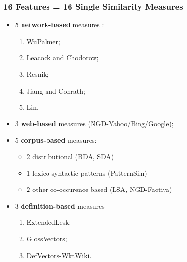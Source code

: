 \begin{frame}
\frametitle{16 Features = 16 Single Similarity Measures}

	\begin{itemize}
	
	\item 5 \textbf{network-based} measures :
	\begin{enumerate}
	  \item WuPalmer;
	  \item Leacock and Chodorow;
	  \item Resnik;
	  \item Jiang and Conrath;
	  \item Lin.
	\end{enumerate} 
	\item 3 \textbf{web-based} measures (NGD-Yahoo/Bing/Google); 
		
	\item 5 \textbf{corpus-based} measures: 
	\begin{itemize}
	  \item 2 distributional (BDA, SDA)
	  \item 1 lexico-syntactic patterns (PatternSim)
	  \item 2 other co-occurence based (LSA, NGD-Factiva)
	\end{itemize}
	
	\item 3 \textbf{definition-based} measures
	\begin{enumerate}
	  \item ExtendedLesk;
	  \item GlossVectors;
	  \item DefVectors-WktWiki.
	\end{enumerate}
	 
\end{itemize}

\end{frame}




